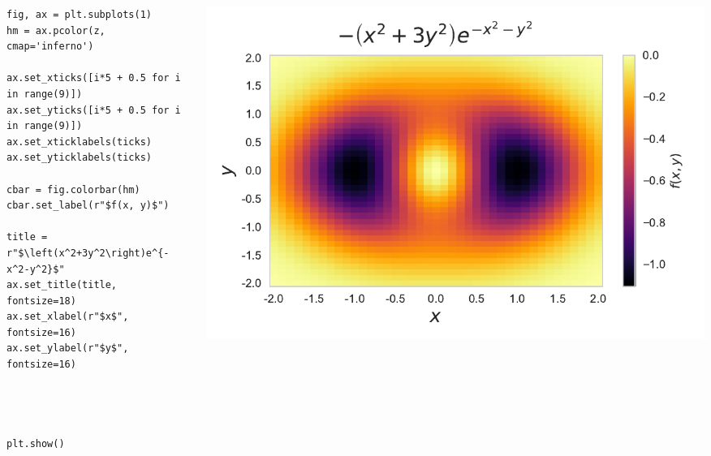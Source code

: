 \documentclass{beamer}
\begin{document}
\begin{frame}[fragile]
\tiny{
\begin{columns}
\begin{column}{0.45\textwidth}
\begin{verbatim}
fig, ax = plt.subplots(1)
hm = ax.pcolor(z, cmap='inferno')

ax.set_xticks([i*5 + 0.5 for i in range(9)])
ax.set_yticks([i*5 + 0.5 for i in range(9)])
ax.set_xticklabels(ticks)
ax.set_yticklabels(ticks)

cbar = fig.colorbar(hm)
cbar.set_label(r"$f(x, y)$")

title = r"$\left(x^2+3y^2\right)e^{-x^2-y^2}$"
ax.set_title(title, fontsize=18)
ax.set_xlabel(r"$x$", fontsize=16)
ax.set_ylabel(r"$y$", fontsize=16)




plt.show()
\end{verbatim}
\end{column}
\begin{column}{0.55\textwidth}
\includegraphics[width=\textwidth]{../heatmap_6.pdf}
\end{column}
\end{columns}
}
\end{frame}
\end{document}
